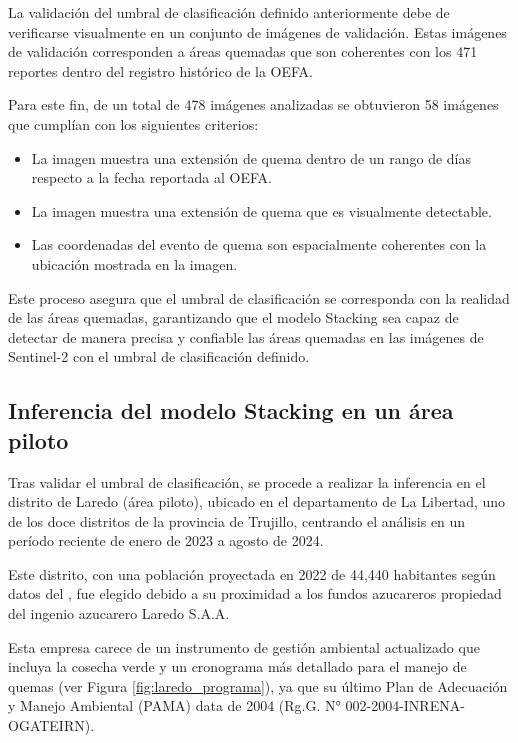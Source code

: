 La validación del umbral de clasificación definido anteriormente debe de verificarse visualmente en un conjunto de imágenes de validación.
Estas imágenes de validación corresponden a áreas quemadas que son coherentes con los 471 reportes dentro del registro histórico de la OEFA.

Para este fin, de un total de 478 imágenes analizadas se obtuvieron 58 imágenes que cumplían con los siguientes criterios:
\begin{itemize} 
    \item La imagen muestra una extensión de quema dentro de un rango de  días respecto a la fecha reportada al OEFA. 
    \item La imagen muestra una extensión de quema que es visualmente detectable. 
    \item Las coordenadas del evento de quema son espacialmente coherentes con la ubicación mostrada en la imagen. 
\end{itemize}

Este proceso asegura que el umbral de clasificación se corresponda con la realidad de las áreas quemadas, garantizando que el modelo Stacking sea capaz de detectar de manera precisa y confiable las áreas 
quemadas en las imágenes de Sentinel-2 con el umbral de clasificación definido.

\subsection{Inferencia del modelo Stacking en un área piloto}
\label{sec:inferencia}
Tras validar el umbral de clasificación, se procede a realizar la inferencia en el distrito de Laredo (área piloto), ubicado en el departamento de La Libertad, uno de los doce distritos de la provincia de Trujillo, centrando el análisis en un período reciente 
de enero de 2023 a agosto de 2024. 

Este distrito, con una población proyectada en 2022 de 44,440 habitantes según datos del 
\citet{inei_peru_2022}, fue elegido debido a su proximidad a los fundos azucareros propiedad del ingenio azucarero Laredo S.A.A. 

Esta empresa carece de un instrumento de gestión ambiental actualizado que incluya la cosecha verde y un cronograma más detallado 
para el manejo de quemas (ver Figura \ref{fig:laredo_programa}), ya que su último Plan de Adecuación y Manejo Ambiental (PAMA) data de 2004 (Rg.G. N° 002-2004-INRENA-OGATEIRN).

